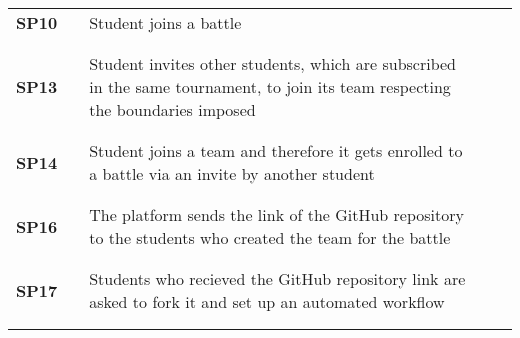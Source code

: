 \begin{longtable}[H]{l l p{8.5cm} l l}
    \textbf{SP10}  & \vline & Student joins a battle                                                                                                          & \vline &                        \\
                   &        &                                                                                                                                 &        &                        \\\hline & & & & \\
    \textbf{SP13}  & \vline & Student invites other students, which are subscribed in the same tournament, to join its team respecting the boundaries imposed & \vline &                        \\
                   &        &                                                                                                                                 &        &                        \\\hline & & & & \\
    \textbf{SP14}  & \vline & Student joins a team and therefore it gets enrolled to a battle via an invite by another student                                & \vline &                        \\
                   &        &                                                                                                                                 &        &                        \\\hline & & & & \\
    \textbf{SP16}  & \vline & The platform sends the link of the GitHub repository to the students who created the team for the battle                        & \vline &                        \\
                   &        &                                                                                                                                 &        &                        \\\hline & & & & \\
    \textbf{SP17}  & \vline & Students who recieved the GitHub repository link are asked to fork it and set up an automated workflow                          & \vline &                        \\
                   &        &                                                                                                                                 &        &                        \\\hline & & & & \\

\end{longtable}
